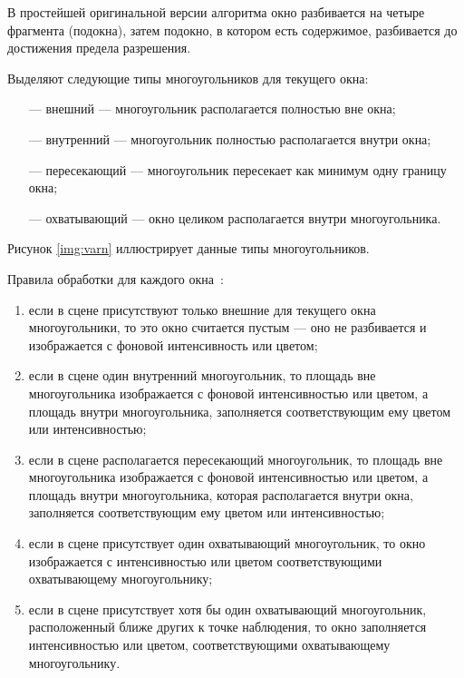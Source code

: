В простейшей оригинальной версии алгоритма окно разбивается на четыре фрагмента (подокна), затем подокно, в котором есть содержимое, разбивается до достижения предела разрешения.

Выделяют следующие типы многоугольников для текущего окна:
\begin{itemize}
	\item[---] внешний --- многоугольник располагается полностью вне окна;
	\item[---] внутренний --- многоугольник полностью располагается внутри окна;
	\item[---] пересекающий --- многоугольник пересекает как минимум одну границу окна;
	\item[---] охватывающий --- окно целиком располагается внутри многоугольника.
\end{itemize}

Рисунок \ref{img:varn} иллюстрирует данные типы многоугольников.


Правила обработки для каждого окна~\cite{varnok}:
\begin{enumerate}
	\item если в сцене присутствуют только внешние для текущего окна многоугольники, то это окно считается пустым --- оно не разбивается и изображается с фоновой интенсивность или цветом;
	\item если в сцене один внутренний многоугольник, то площадь вне многоугольника изображается с фоновой интенсивностью или цветом, а площадь внутри многоугольника, заполняется соответствующим ему цветом или интенсивностью;
	\item если в сцене располагается пересекающий многоугольник, то площадь вне многоугольника изображается с фоновой интенсивностью или цветом, а площадь внутри многоугольника, которая располагается внутри окна, заполняется соответствующим ему цветом или интенсивностью;
	\item если в сцене присутствует один охватывающий многоугольник, то окно изображается с интенсивностью или цветом соответствующими охватывающему многоугольнику;
	\item если в сцене присутствует хотя бы один охватывающий многоугольник, расположенный ближе других к точке наблюдения, то окно заполняется интенсивностью или цветом, соответствующими охватывающему многоугольнику.
\end{enumerate}

